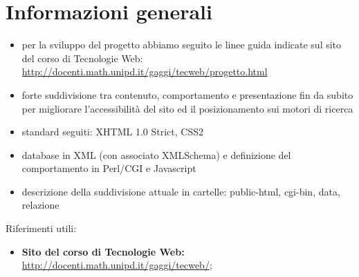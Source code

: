 \documentclass[../relazione.tex]{subfiles}
\begin{document}
\section{Informazioni generali}
	\begin{itemize}
		\item per la sviluppo del progetto abbiamo seguito le linee guida indicate sul sito del corso di Tecnologie Web: \url{http://docenti.math.unipd.it/gaggi/tecweb/progetto.html}
		\item forte suddivisione tra contenuto, comportamento e presentazione fin da subito per migliorare l'accessibilità del sito ed il posizionamento sui motori di ricerca
		\item standard seguiti: XHTML 1.0 Strict, CSS2
		\item database in XML (con associato XMLSchema) e definizione del comportamento in Perl/CGI e Javascript
		\item descrizione della suddivisione attuale in cartelle: public-html, cgi-bin, data, relazione
	\end{itemize}
	Riferimenti utili:
		\begin{itemize}
			\item \textbf{Sito del corso di Tecnologie Web:} \\\url{http://docenti.math.unipd.it/gaggi/tecweb/};
		\end{itemize}
\end{document}

